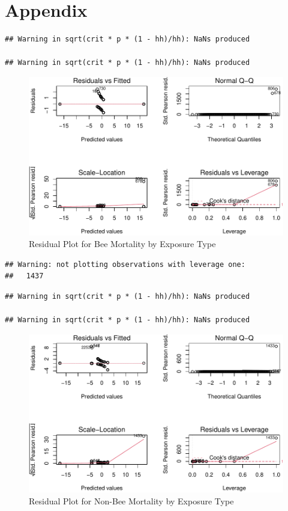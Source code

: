 \documentclass[
  12pt,
]{article}
\begin{document}
\newpage

\hypertarget{appendix}{%
\section{Appendix}\label{appendix}}

\begin{verbatim}
## Warning in sqrt(crit * p * (1 - hh)/hh): NaNs produced

## Warning in sqrt(crit * p * (1 - hh)/hh): NaNs produced
\end{verbatim}

\begin{figure}
\centering
\includegraphics{UpdatedwithModel_files/figure-latex/unnamed-chunk-8-1.pdf}
\caption{Residual Plot for Bee Mortality by Exposure Type}
\end{figure}

\begin{verbatim}
## Warning: not plotting observations with leverage one:
##   1437
\end{verbatim}

\begin{verbatim}
## Warning in sqrt(crit * p * (1 - hh)/hh): NaNs produced

## Warning in sqrt(crit * p * (1 - hh)/hh): NaNs produced
\end{verbatim}

\begin{figure}
\centering
\includegraphics{UpdatedwithModel_files/figure-latex/unnamed-chunk-9-1.pdf}
\caption{Residual Plot for Non-Bee Mortality by Exposure Type}
\end{figure}
\end{document}
